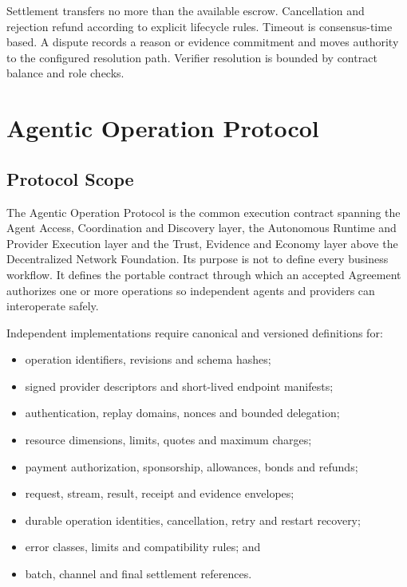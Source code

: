 \documentclass[11pt,oneside]{article}
\begin{document}
Settlement transfers no more than the available escrow. Cancellation and rejection refund
according to explicit lifecycle rules. Timeout is consensus-time based. A dispute records a
reason or evidence commitment and moves authority to the configured resolution path. Verifier
resolution is bounded by contract balance and role checks.


\section{Agentic Operation Protocol}
\label{sec:protocol}

\subsection{Protocol Scope}

The Agentic Operation Protocol is the common execution contract spanning the Agent Access,
Coordination and Discovery layer, the Autonomous Runtime and Provider Execution layer and the
Trust, Evidence and Economy layer above the Decentralized Network Foundation. Its purpose is
not to define every business workflow. It defines the portable contract through which an
accepted Agreement authorizes one or more operations so independent agents and providers can
interoperate safely.

Independent implementations require canonical and versioned definitions for:

\begin{itemize}
  \item operation identifiers, revisions and schema hashes;
  \item signed provider descriptors and short-lived endpoint manifests;
  \item authentication, replay domains, nonces and bounded delegation;
  \item resource dimensions, limits, quotes and maximum charges;
  \item payment authorization, sponsorship, allowances, bonds and refunds;
  \item request, stream, result, receipt and evidence envelopes;
  \item durable operation identities, cancellation, retry and restart recovery;
  \item error classes, limits and compatibility rules; and
  \item batch, channel and final settlement references.
\end{itemize}
\end{document}
